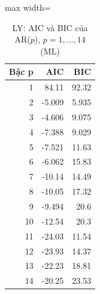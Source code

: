 \begin{table}[H]
\centering\footnotesize
\caption{LY: AIC và BIC của AR($p$), $p=1,\dots,14$ (ML)}\label{tab:tab_b11_13_ly_ic}
\begin{adjustbox}{max width=\linewidth}
\begin{tabular}{|r|r|r|}
\toprule
Bậc p & AIC & BIC \\
\midrule
1 & 84.11 & 92.32 \\
2 & -5.009 & 5.935 \\
3 & -4.606 & 9.075 \\
4 & -7.388 & 9.029 \\
5 & -7.521 & 11.63 \\
6 & -6.062 & 15.83 \\
7 & -10.14 & 14.49 \\
8 & -10.05 & 17.32 \\
9 & -9.494 & 20.6 \\
10 & -12.54 & 20.3 \\
11 & -24.03 & 11.54 \\
12 & -23.93 & 14.37 \\
13 & -22.23 & 18.81 \\
14 & -20.25 & 23.53 \\
\bottomrule
\end{tabular}
\end{adjustbox}
\end{table}
